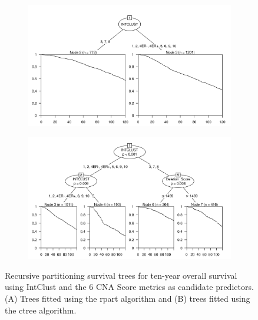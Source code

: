 \begin{figure}[!htb]
\centering

\vspace{0.5cm}

\begin{subfigure}{\textwidth}
\subcaption{}
\includegraphics[width=1\textwidth]{../figures/Appendices/Appendix_B/PartyKit_Survival_Score_TenYearOS_INTCLUST.png}
\end{subfigure}

\vspace{2cm}

\begin{subfigure}{\textwidth}
\subcaption{}
\includegraphics[width=1\textwidth]{../figures/Appendices/Appendix_B/Ctree_Survival_Score_TenYearOS_INTCLUST.png}
\end{subfigure}

\vspace{0.5cm}

\caption[Recursive partitioning survival trees for ten-year overall survival using IntClust and the 6 CNA Score metrics as candidate predictors.]{Recursive partitioning survival trees for ten-year overall survival using IntClust and the 6 CNA Score metrics as candidate predictors. (A) Trees fitted using the rpart algorithm and (B) trees fitted using the ctree algorithm.}
\end{figure}

